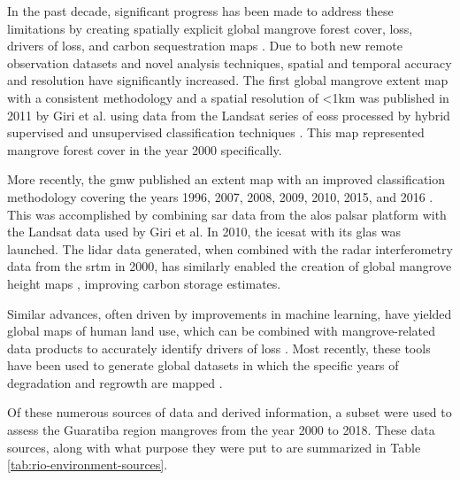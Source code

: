 In the past decade, significant progress has been made to address these limitations by creating spatially explicit global mangrove forest cover, loss, drivers of loss, and carbon sequestration maps \cite{spaldingWorldAtlasMangroves2010, donatoMangrovesMostCarbonrich2011, sandermanGlobalMapMangrove2018, simardMangroveCanopyHeight2019, goldbergGlobalDeclinesHuman2020}. Due to both new remote observation datasets and novel analysis techniques,   spatial and temporal accuracy and resolution have significantly increased. The first global mangrove extent map with a consistent methodology and a spatial resolution of <1km was published in 2011 by Giri et al. using data from the Landsat series of \acp{eos} processed by hybrid supervised and unsupervised classification techniques \cite{giriStatusDistributionMangrove2011}. This map represented mangrove forest cover in the year 2000 specifically. 

More recently, the \ac{gmw} published an extent map with an improved classification methodology covering the years 1996, 2007, 2008, 2009, 2010, 2015, and 2016 \cite{buntingGlobalMangroveWatch2018}. This was accomplished by combining \ac{sar} data from the \ac{alos} \ac{palsar} platform with the Landsat data used by Giri et al. In 2010, the \ac{icesat} with its \ac{glas} was launched. The lidar data generated, when combined with the radar interferometry data from the \ac{srtm} in 2000, has similarly enabled the creation of global mangrove height maps \cite{simardMangroveCanopyHeight2019}, improving carbon storage estimates. 

Similar advances, often driven by improvements in machine learning, have yielded global maps of human land use, which can be combined with mangrove-related data products to accurately identify drivers of loss \cite{goldbergGlobalDeclinesHuman2020}. Most recently, these tools have been used to generate global datasets in which the specific years of degradation and regrowth are mapped \cite{vancutsemLongterm199020192021}.

Of these numerous sources of data and derived information, a subset were used to assess the Guaratiba region mangroves from the year 2000 to 2018. These data sources, along with what purpose they were put to are summarized in Table \ref{tab:rio-environment-sources}.

